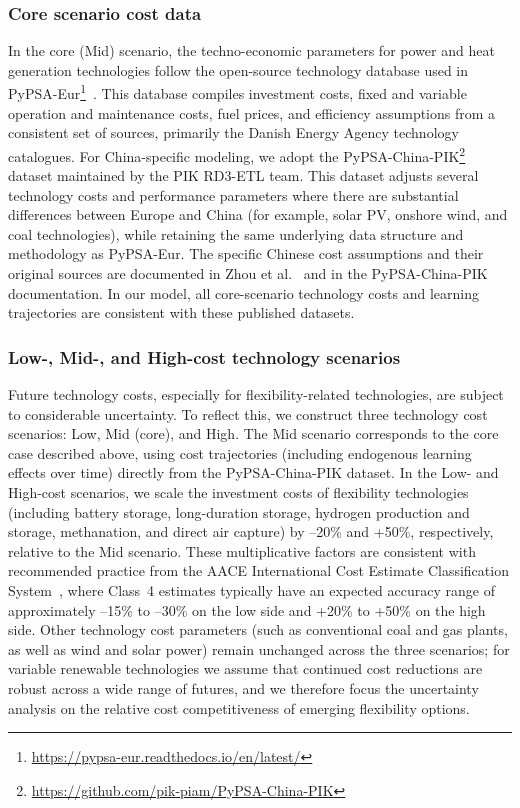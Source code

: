 \documentclass[preprint,12pt]{elsarticle}
\begin{document}
\subsubsection{Core scenario cost data}
In the core (Mid) scenario, the techno-economic parameters for power and heat generation technologies follow the open-source technology database used in PyPSA-Eur\footnote{\url{https://pypsa-eur.readthedocs.io/en/latest/}}~\citep{PyPSAEur}. This database compiles investment costs, fixed and variable operation and maintenance costs, fuel prices, and efficiency assumptions from a consistent set of sources, primarily the Danish Energy Agency technology catalogues. For China-specific modeling, we adopt the PyPSA-China-PIK\footnote{\url{https://github.com/pik-piam/PyPSA-China-PIK}} dataset maintained by the PIK RD3-ETL team. This dataset adjusts several technology costs and performance parameters where there are substantial differences between Europe and China (for example, solar PV, onshore wind, and coal technologies), while retaining the same underlying data structure and methodology as PyPSA-Eur. The specific Chinese cost assumptions and their original sources are documented in Zhou et al.~\citep{zhou_multienergy_2024} and in the PyPSA-China-PIK documentation. In our model, all core-scenario technology costs and learning trajectories are consistent with these published datasets.

\subsubsection{Low-, Mid-, and High-cost technology scenarios}
Future technology costs, especially for flexibility-related technologies, are subject to considerable uncertainty. To reflect this, we construct three technology cost scenarios: Low, Mid (core), and High. The Mid scenario corresponds to the core case described above, using cost trajectories (including endogenous learning effects over time) directly from the PyPSA-China-PIK dataset. In the Low- and High-cost scenarios, we scale the investment costs of flexibility technologies (including battery storage, long-duration storage, hydrogen production and storage, methanation, and direct air capture) by --20\% and +50\%, respectively, relative to the Mid scenario. These multiplicative factors are consistent with recommended practice from the AACE International Cost Estimate Classification System~\citep{bates2005cost}, where Class~4 estimates typically have an expected accuracy range of approximately --15\% to --30\% on the low side and +20\% to +50\% on the high side. Other technology cost parameters (such as conventional coal and gas plants, as well as wind and solar power) remain unchanged across the three scenarios; for variable renewable technologies we assume that continued cost reductions are robust across a wide range of futures, and we therefore focus the uncertainty analysis on the relative cost competitiveness of emerging flexibility options.
\end{document}
